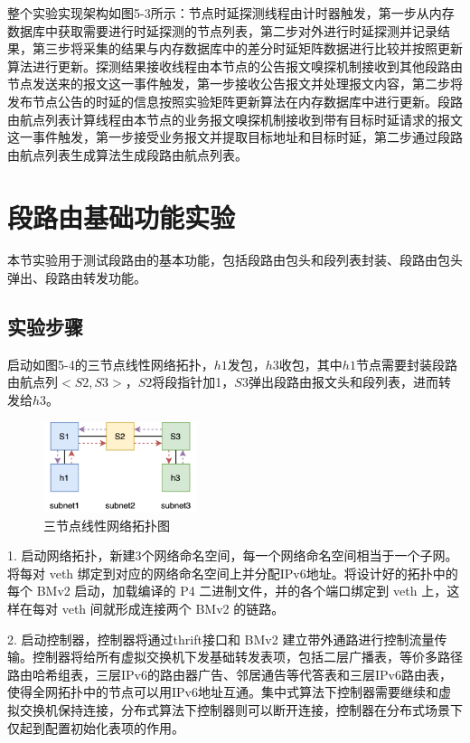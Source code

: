 整个实验实现架构如图5-3所示：节点时延探测线程由计时器触发，第一步从内存数据库中获取需要进行时延探测的节点列表，第二步对外进行时延探测并记录结果，第三步将采集的结果与内存数据库中的差分时延矩阵数据进行比较并按照更新算法进行更新。探测结果接收线程由本节点的公告报文嗅探机制接收到其他段路由节点发送来的报文这一事件触发，第一步接收公告报文并处理报文内容，第二步将发布节点公告的时延的信息按照实验矩阵更新算法在内存数据库中进行更新。段路由航点列表计算线程由本节点的业务报文嗅探机制接收到带有目标时延请求的报文这一事件触发，第一步接受业务报文并提取目标地址和目标时延，第二步通过段路由航点列表生成算法生成段路由航点列表。

\section{段路由基础功能实验}

本节实验用于测试段路由的基本功能，包括段路由包头和段列表封装、段路由包头弹出、段路由转发功能。

\subsection{实验步骤}

启动如图5-4的三节点线性网络拓扑，$h1$发包，$h3$收包，其中$h1$节点需要封装段路由航点列$<S2, S3>$，$S2$将段指针加1，$S3$弹出段路由报文头和段列表，进而转发给$h3$。

\begin{figure}[htbp]
\setlength{\abovecaptionskip}{15pt plus 3pt minus 2pt}
\centerline{\includegraphics[width=0.4\textwidth]{./figures/ch5-three-line-topo.png}}
\caption{三节点线性网络拓扑图}
\label{fig-ch5-three-line-topo}
\end{figure}

1. 启动网络拓扑，新建3个网络命名空间，每一个网络命名空间相当于一个子网。将每对 \gls*{veth} 绑定到对应的网络命名空间上并分配IPv6地址。将设计好的拓扑中的每个 \gls*{BMv2} 启动，加载编译的 \gls*{P4} 二进制文件，并的各个端口绑定到 \gls*{veth} 上，这样在每对 \gls*{veth} 间就形成连接两个 \gls*{BMv2} 的链路。

2. 启动控制器，控制器将通过thrift接口和 \gls*{BMv2} 建立带外通路进行控制流量传输。控制器将给所有虚拟交换机下发基础转发表项，包括二层广播表，等价多路径路由哈希组表，三层IPv6的路由器广告、邻居通告等代答表和三层IPv6路由表，使得全网拓扑中的节点可以用IPv6地址互通。集中式算法下控制器需要继续和虚拟交换机保持连接，分布式算法下控制器则可以断开连接，控制器在分布式场景下仅起到配置初始化表项的作用。

